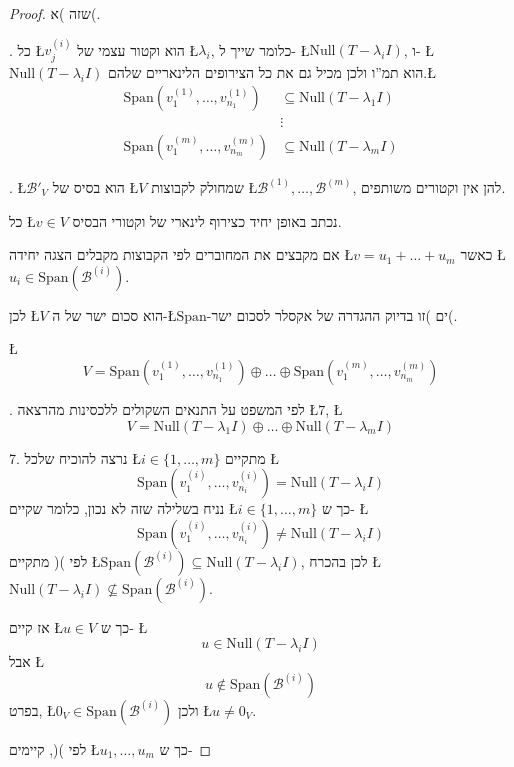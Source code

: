 \documentclass[english,hebrew]{article}
\begin{document}
\begin{proof}
שזה )א(.

{\endL}. כל \L{$v_{j}^{(i)}$} הוא וקטור עצמי של \L{$\lambda_{i}$},
כלומר שייך ל- \L{$\text{Null}(T-\lambda_{i}I)$}, ו- \L{$\text{Null}(T-\lambda_{i}I)$}
הוא תמ\textquotedblright ו ולכן מכיל גם את כל הצירופים הלינאריים שלהם.\L{%
\begin{align*}
\text{Span}\left(v_{1}^{(1)},\dots,v_{n_{1}}^{(1)}\right) & \subseteq\text{Null}(T-\lambda_{1}I)\\
 & \vdots\\
\text{Span}\left(v_{1}^{(m)},\dots,v_{n_{m}}^{(m)}\right) & \subseteq\text{Null}(T-\lambda_{m}I)
\end{align*}
}%

{\endL}. \L{$\mathcal{B}'_{V}$} הוא בסיס של \L{$V$} שמחולק
לקבוצות \L{$\mathcal{B}^{(1)},\dots,\mathcal{B}^{(m)}$}, להן אין
וקטורים משותפים.

כל \L{$v\in V$} נכתב באופן יחיד כצירוף לינארי של וקטורי הבסיס.

אם מקבצים את המחוברים לפי הקבוצות מקבלים הצגה יחידה \L{$v=u_{1}+\dots+u_{m}$}
כאשר \L{$u_{i}\in\text{Span}\left(\mathcal{B}^{(i)}\right)$}.

לכן \L{$V$} הוא סכום ישר של ה-\L{$\text{Span}$}-ים )זו בדיוק ההגדרה
של אקסלר לסכום ישר(.

\L{%
\[
V=\text{Span}\left(v_{1}^{(1)},\dots,v_{n_{1}}^{(1)}\right)\oplus\dots\oplus\text{Span}\left(v_{1}^{(m)},\dots,v_{n_{m}}^{(m)}\right)
\]
}%

{\endL}. לפי המשפט על התנאים השקולים ללכסינות מהרצאה \L{$7$},
\L{%
\[
V=\text{Null}(T-\lambda_{1}I)\oplus\dots\oplus\text{Null}(T-\lambda_{m}I)
\]
}%

7. נרצה להוכיח שלכל \L{$i\in\{1,\dots,m\}$} מתקיים \L{%
\[
\text{Span}\left(v_{1}^{(i)},\dots,v_{n_{i}}^{(i)}\right)=\text{Null}(T-\lambda_{i}I)
\]
}%
נניח בשלילה שזה לא נכון, כלומר שקיים \L{$i\in\{1,\dots,m\}$} כך ש-
\L{%
\[
\text{Span}\left(v_{1}^{(i)},\dots,v_{n_{i}}^{(i)}\right)\neq\text{Null}(T-\lambda_{i}I)
\]
}%
לפי ){\endL}( מתקיים \L{$\text{Span}\left(\mathcal{B}^{(i)}\right)\subseteq\text{Null}(T-\lambda_{i}I)$},
לכן בהכרח \L{$\text{Null}(T-\lambda_{i}I)\not\subseteq\text{Span}\left(\mathcal{B}^{(i)}\right)$}.

אז קיים \L{$u\in V$} כך ש- \L{%
\[
u\in\text{Null}(T-\lambda_{i}I)
\]
}%
אבל \L{%
\[
u\notin\text{Span}\left(\mathcal{B}^{(i)}\right)
\]
}%
בפרט, \L{$0_{V}\in\text{Span}\left(\mathcal{B}^{(i)}\right)$} ולכן
\L{$u\neq0_{V}$}.

לפי ){\endL}(, קיימים \L{$u_{1},\dots,u_{m}$} כך ש-


\end{proof}
\end{document}
